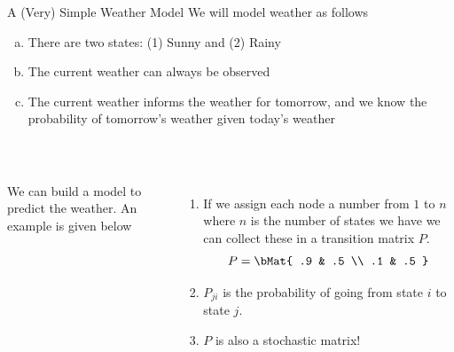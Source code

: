 \documentclass[xcoler=dvipsnames, aspectratio=169]{beamer}
\begin{document}
    \begin{frame}{A (Very) Simple Weather Model}
        \footnotesize
        We will model weather as follows
        \begin{enumerate}[a)]
            \pause\item There are two states: (1) Sunny and (2) Rainy
            \pause\item The current weather can always be observed
            \pause\item The current weather informs the weather for tomorrow, and we know the probability
                of tomorrow's weather given today's weather
        \end{enumerate}\pause\
        \vspace{10pt}
        \begin{columns}
            We can build a model to predict the weather. An example is given below\pause\\
            \begin{center}
            \end{center}
            \begin{enumerate}
                \pause\item If we assign each node a number from $1$ to $n$ where $n$ is
                    the number of states we have we can collect these in a transition matrix $P$.\pause\
                    \[
                        P = \bMat{
                            .9 & .5 \\
                            .1 & .5
                        }
                    \]
                    \vspace{-12pt}
                \pause\item $P_{ji}$ is the probability of going from state $i$ to state $j$.
                \pause\item $P$ is also a stochastic matrix!
            \end{enumerate}
        \end{columns}
    \end{frame}
\end{document}
